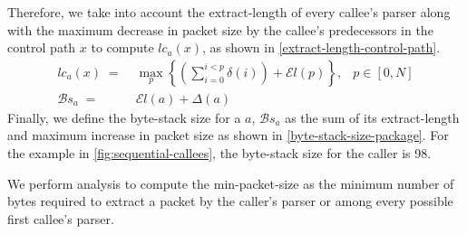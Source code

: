 \documentclass[letterpaper,twocolumn,10pt]{article}
\begin{document}
Therefore, we take into account the extract-length of every callee's
parser along with the maximum decrease in packet size by the callee's
predecessors in the control path $x$ to compute $lc_{a}(x)$,
as shown in \cref{extract-length-control-path}.
\begin{align}
lc_{a}(x) \; =& \; \max_{p} \left\{ \left( \sum_{i=0}^{i<p} \delta(i) \right)+ \mathcal{E}l(p) \right\},&p \in [0,N] \label{extract-length-control-path} \\
\mathcal{B}s_{a} \; =& \; \mathcal{E}l(a) + \Delta(a) & \label{byte-stack-size-package}
\end{align}
Finally, we define the byte-stack size for a \uprogram $a$,
$\mathcal{B}s_{a}$  as the sum of its extract-length and maximum
increase in packet size as shown in \cref{byte-stack-size-package}.
For the example in \cref{fig:sequential-callees}, the byte-stack size
for the caller is 98.

We perform analysis to compute the min-packet-size as 
the minimum number of bytes required to extract a packet by the 
caller's parser or among every possible first callee's parser.
\end{document}
